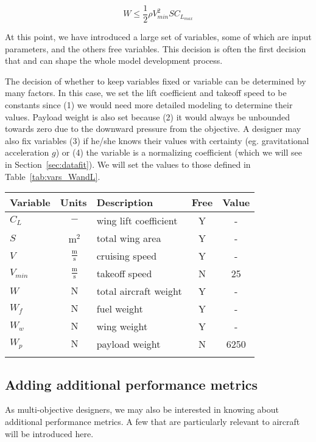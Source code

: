 \begin{equation}
    W \leq \frac{1}{2} \rho V_{min}^2 S C_{L_{max}}
\end{equation}

At this point, we have introduced a large set of variables, some of which are input
parameters, and the others free variables. This decision is often the first decision
that
and can shape the whole model development process.

The decision of whether to keep variables fixed or variable can be determined by many
factors. In this case, we set the lift coefficient and takeoff speed to be constants since
(1) we would need
more detailed modeling to determine their values. Payload weight is also set
because (2) it would always be unbounded towards zero due to the downward pressure from
the objective. A designer may also fix variables (3) if he/she knows their values with
certainty (eg. gravitational acceleration $g$) or (4) the variable is a normalizing
coefficient (which we will see in Section~\ref{sec:datafit}). We will set the values
to those defined in Table~\ref{tab:vars_WandL}.

\footnotesize
\centering
\begin{tabular}{ l c l c c}
    \toprule
	Variable & Units & Description & Free & Value \\
    \midrule
    $C_L$ & $~\mathrm{-}$ & wing lift coefficient & Y & - \\
    $S$ & $~\mathrm{m^{2}}$ & total wing area & Y & - \\
    $V$ & $~\mathrm{\tfrac{m}{s}}$ & cruising speed & Y & - \\
    $V_{min}$ & $~\mathrm{\tfrac{m}{s}}$ & takeoff speed & N & 25 \\
    $W$ & $~\mathrm{N}$ & total aircraft weight & Y & -\\
    $W_f$ & $~\mathrm{N}$ & fuel weight & Y & -\\
    $W_w$ & $~\mathrm{N}$ & wing weight & Y & - \\
    $W_p$ & $~\mathrm{N}$ & payload weight & N & 6250\\
    \bottomrule
    \label{tab:vars_WandL}
\end{tabular}

\subsection{Adding additional performance metrics}

As multi-objective designers, we may also be interested in knowing about additional performance metrics. A
few that are particularly relevant to aircraft will be introduced here.

